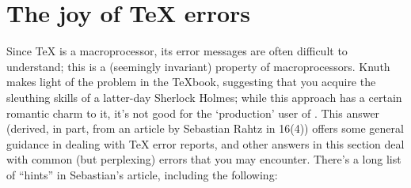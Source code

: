 
\section{The joy of \TeX{} errors}


Since \TeX{} is a macroprocessor, its error messages are often
difficult to understand; this is a (seemingly invariant) property of
macroprocessors.  Knuth makes light of the problem in the \TeX{}book,
suggesting that you acquire the sleuthing skills of a latter-day
Sherlock Holmes; while this approach has a certain romantic charm to
it, it's not good for the `production' user of \AllTeX{}.  This
answer (derived, in part, from an article by Sebastian Rahtz in
\TUGboat{} 16(4)) offers some general guidance in dealing with \TeX{}
error reports, and other answers in this section deal with common (but
perplexing) errors that you may encounter.  There's a long list of
``hints'' in Sebastian's article, including the following:
